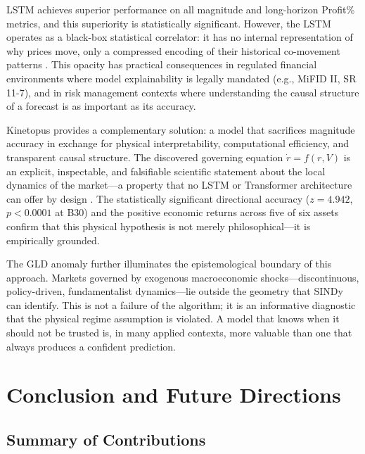 \documentclass[11pt,a4paper]{article}
\begin{document}
LSTM achieves superior performance on all magnitude and long-horizon Profit\% metrics, and this superiority is statistically significant. However, the LSTM operates as a black-box statistical correlator: it has no internal representation of why prices move, only a compressed encoding of their historical co-movement patterns \cite{hochreiter1997long}. This opacity has practical consequences in regulated financial environments where model explainability is legally mandated (e.g., MiFID II, SR 11-7), and in risk management contexts where understanding the causal structure of a forecast is as important as its accuracy.

Kinetopus provides a complementary solution: a model that sacrifices magnitude accuracy in exchange for physical interpretability, computational efficiency, and transparent causal structure. The discovered governing equation $\dot{r} = f(r, V)$ is an explicit, inspectable, and falsifiable scientific statement about the local dynamics of the market---a property that no LSTM or Transformer architecture can offer by design \cite{vaswani2017attention}. The statistically significant directional accuracy ($z = 4.942$, $p < 0.0001$ at B30) and the positive economic returns across five of six assets confirm that this physical hypothesis is not merely philosophical---it is empirically grounded.

The GLD anomaly further illuminates the epistemological boundary of this approach. Markets governed by exogenous macroeconomic shocks---discontinuous, policy-driven, fundamentalist dynamics---lie outside the geometry that SINDy can identify. This is not a failure of the algorithm; it is an informative diagnostic that the physical regime assumption is violated. A model that knows when it should not be trusted is, in many applied contexts, more valuable than one that always produces a confident prediction.

\section{Conclusion and Future Directions}
\label{sec:conclusion}

\subsection{Summary of Contributions}
\end{document}

